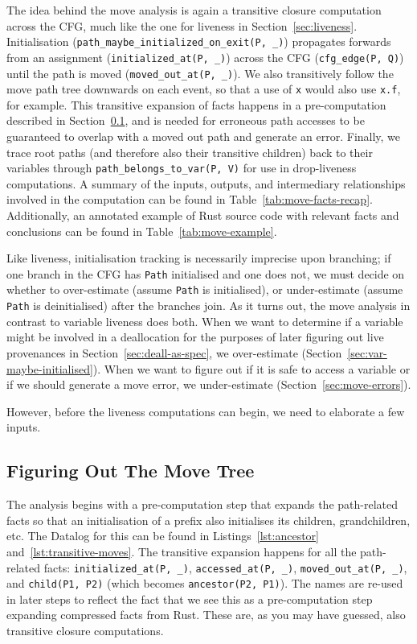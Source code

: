 \documentclass[11pt,a4paper,twoside,openany,draft]{report}
\newcommand{\InRust}[1]{\texttt{#1}}
\newcommand{\InDatalog}[1]{\texttt{#1}}
\begin{document}
The idea behind the move analysis is again a transitive closure computation
across the CFG, much like the one for liveness in Section~\ref{sec:liveness}.
Initialisation (\InDatalog{path_maybe_initialized_on_exit(P, _)}) propagates
forwards from an assignment (\InDatalog{initialized_at(P, _)}) across the CFG
(\InDatalog{cfg_edge(P, Q)}) until the path is moved (\InDatalog{moved_out_at(P,
  _)}). We also transitively follow the move path tree downwards on each event,
so that a use of \InRust{x} would also use \InRust{x.f}, for example. This
transitive expansion of facts happens in a pre-computation described in
Section~\ref{sec:move:fixpoints}, and is needed for erroneous path accesses to
be guaranteed to overlap with a moved out path and generate an error. Finally,
we trace root paths (and therefore also their transitive children) back to their
variables through \InDatalog{path_belongs_to_var(P, V)} for use in drop-liveness
computations. A summary of the inputs, outputs, and intermediary relationships
involved in the computation can be found in Table~\ref{tab:move-facts-recap}.
Additionally, an annotated example of Rust source code with relevant facts and
conclusions can be found in Table~\ref{tab:move-example}.

Like liveness, initialisation tracking is necessarily imprecise upon branching;
if one branch in the CFG has \InDatalog{Path} initialised and one does not, we
must decide on whether to over-estimate (assume \InDatalog{Path} is
initialised), or under-estimate (assume \InDatalog{Path} is deinitialised) after
the branches join. As it turns out, the move analysis in contrast to variable
liveness does both. When we want to determine if a variable might be involved in
a deallocation for the purposes of later figuring out live provenances in
Section~\ref{sec:deall-as-spec}, we over-estimate
(Section~\ref{sec:var-maybe-initialised}). When we want to figure out if it is
safe to access a variable or if we should generate a move error, we
under-estimate (Section~\ref{sec:move-errors}).

However, before the liveness computations can begin, we need to elaborate a few
inputs.

\subsection{Figuring Out The Move Tree}\label{sec:move:fixpoints}

The analysis begins with a pre-computation step that expands the path-related
facts so that an initialisation of a prefix also initialises its children,
grandchildren, etc. The Datalog for this can be found in
Listings~\ref{lst:ancestor} and~\ref{lst:transitive-moves}. The transitive
expansion happens for all the path-related facts: \InDatalog{initialized_at(P,
  _)}, \InDatalog{accessed_at(P, _)}, \InDatalog{moved_out_at(P, _)}, and
\InDatalog{child(P1, P2)} (which becomes \InDatalog{ancestor(P2, P1)}). The
names are re-used in later steps to reflect the fact that we see this as a
pre-computation step expanding compressed facts from Rust. These are, as you may
have guessed, also transitive closure computations.
\end{document}
